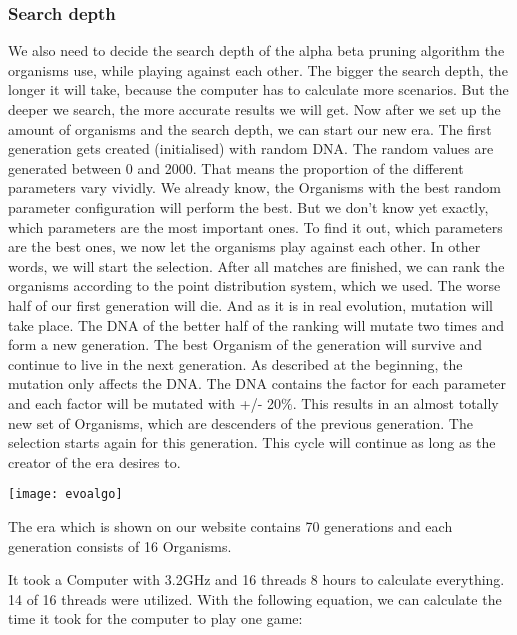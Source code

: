 \subsubsection{Search depth}
We also need to decide the search depth of the alpha beta pruning algorithm the organisms use, while playing against each other. The bigger the search depth, the longer it will take, because the computer has to calculate more scenarios. But the deeper we search, the more accurate results we will get. 
Now after we set up the amount of organisms and the search depth, we can start our new era. The first generation gets created (initialised) with random DNA. The random values are generated between 0 and 2000.
That means the proportion of the different parameters vary vividly. We already know, the Organisms with the best random parameter configuration will perform the best. But we don't know yet exactly, which parameters are the most important ones. To find it out, which parameters are the best ones, we now let the organisms play against each other. In other words, we will start the selection. After all matches are finished, we can rank the organisms according to the point distribution system, which we used. The worse half of our first generation will die. And as it is in real evolution, mutation will take place.
The DNA of the better half of the ranking will mutate two times and form a new generation. The best Organism of the generation will survive and continue to live in the next generation.
As described at the beginning, the mutation only affects the DNA. The DNA contains the factor for each parameter and each factor will be mutated with +/- 20\%. This results in an almost totally new set of Organisms, which are descenders of the previous generation. The selection starts again for this generation.
This cycle will continue as long as the creator of the era desires to. \\

\begin{fixedpic}
	\centering
	\texttt{[image: evoalgo]}
\end{fixedpic}


The era which is shown on our website contains 70 generations and each generation consists of 16 Organisms.

It took a Computer with 3.2GHz and 16 threads 8 hours to calculate everything. 14 of 16 threads were utilized. With the following equation, we can calculate the time it took for the computer to play one game:

